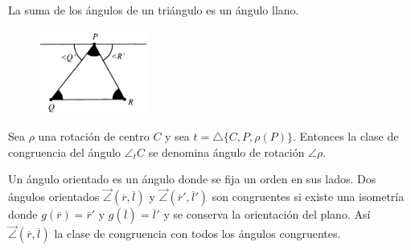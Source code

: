 \obligatorio{} 

 La suma de los ángulos de un triángulo es un ángulo llano.

\begin{figure}[H]
	\centering
	\includegraphics[width=3.5cm]{figuras/4-41.png}
	\vspace{-1em}
\end{figure}

 Sea $\rho$ una rotación de centro $C$ y sea $t = \triangle\{C, P, \rho(P) \}$. Entonces la clase de congruencia del ángulo $\angle_t C$ se denomina ángulo de rotación $\angle\rho$.

 Un ángulo orientado es un ángulo donde se fija un orden en sus lados. Dos ángulos orientados $\overrightarrow{\angle}(\overline{r}, \overline{l})$ y  $\overrightarrow{\angle}(\overline{r}', \overline{l}')$ son congruentes si existe una isometría donde $g(\overline{r}) = \overline{r}'$ y $g(\overline{l}) = \overline{l}'$ y se conserva la orientación del plano. Así $\overrightarrow{\angle}(\overline{r}, \overline{l})$ la clase de congruencia con todos los ángulos congruentes.










